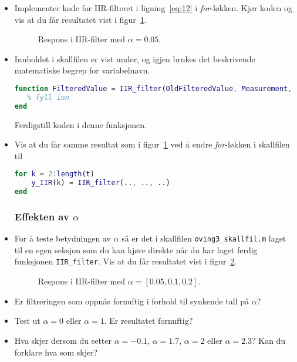 \begin{itemize}

\item  Implementer  kode for
IIR-filteret i ligning~\eqref{eq:12} i {\it for}-løkken. Kjør koden og
vis at du får resultatet vist i  figur~\ref{fig:3j}.
    \begin{figure}[H]
      \centering
      \hspace*{0mm}
      \caption{Respons i IIR-filter med $\alpha{=}0.05$. }
      \label{fig:3j}
    \end{figure}
    
    
\item Innholdet i skallfilen   er vist under, 
og igjen brukes det beskrivende matematiske begrep for variabelnavn.

\begin{lstlisting}[caption={Skall for funksjonen for IIR-filtrering.},
 language= Matlab,   label=kode:IIR_funk, numbers=none, linewidth = 14.5cm] 
function FilteredValue = IIR_filter(OldFilteredValue, Measurement, para)
   % fyll inn
end
\end{lstlisting}
Ferdigstill koden i denne funksjonen.

\item Vis at du får samme   resultat som i figur~\ref{fig:3j} ved å
  endre {\it for}-løkken i skallfilen til 

\begin{lstlisting}[caption={Skall for funksjonen for IIR-filtrering.},
 language= Matlab,   label=kode:IIR_funk2,
 numbers=none]
 for k = 2:length(t)
    y_IIR(k) = IIR_filter(.., .., ..)
end
\end{lstlisting}

\subsubsection*{Effekten av $\alpha$}

\item For å teste betydningen av $\alpha$ så 
  er det i skallfilen {\tt oving3\_skallfil.m} laget til en egen
  seksjon som du kan kjøre direkte når du har laget ferdig funksjonen
  {\tt IIR\_filter}.    
Vis at du får resultatet vist i figur~\ref{fig:3j2}.

    \begin{figure}[H]
      \centering
      \hspace*{0mm}
      \caption{Respons i IIR-filter med $\alpha{=}[0.05, 0.1, 0.2]$. }
      \label{fig:3j2}
    \end{figure}

    \item   Er filtreringen som oppnås fornuftig i forhold til synkende tall på $\alpha$?

    \item Test ut $\alpha=0$ eller $\alpha=1$. Er
      resultatet fornuftig?

    \item Hva skjer dersom du setter $\alpha=-0.1$,  $\alpha=1.7$,
      $\alpha=2$ eller $\alpha=2.3$? Kan du forklare hva som skjer?

      
\end{itemize}
